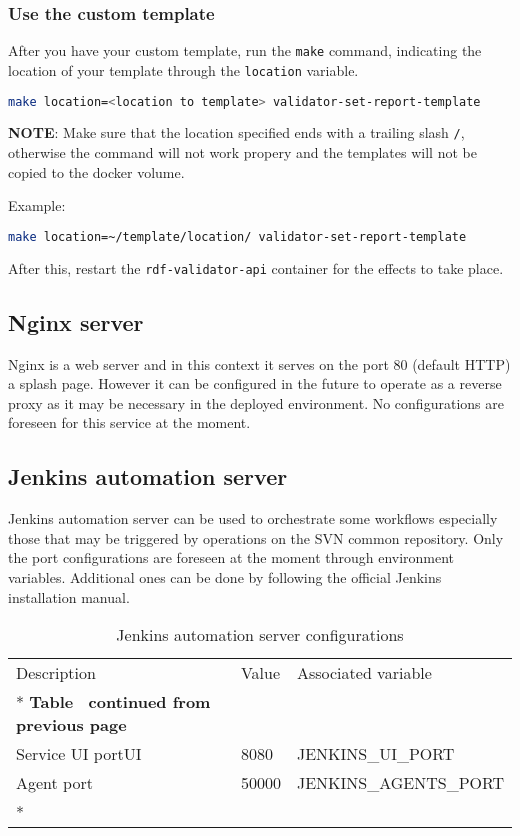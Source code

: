 	\subsubsection{Use the custom template}
	After you have your custom template, run the \texttt{make} command, indicating the location of your template through the \texttt{location} variable.
	\begin{lstlisting}[language=bash]
make location=<location to template> validator-set-report-template
	\end{lstlisting}

	\textbf{NOTE}: Make sure that the location specified ends with a trailing slash \texttt{/}, otherwise the command will not work propery and the templates will not be copied to the docker volume.

	Example:
	\begin{lstlisting}[language=bash]
make location=~/template/location/ validator-set-report-template
	\end{lstlisting}

	After this, restart the \texttt{rdf-validator-api} container for the effects to take place.


	\subsection{Nginx server}
	
	Nginx is a web server and in this context it serves on the port 80 (default HTTP) a splash page. However it can be configured in the future to operate as a reverse proxy as it may be necessary in the deployed environment. No configurations are foreseen for this service at the moment. 
	
	\subsection{Jenkins automation server}
	
	Jenkins automation server can be used to orchestrate some workflows especially those that may be triggered by operations on the SVN common repository. Only the port configurations are foreseen at the moment through environment variables. Additional ones can be done by following the official Jenkins installation manual. 
	
	\begin{longtable}[c]{@{}p{4cm}p{5cm}l@{}}
		\toprule
		Description & Value & Associated variable \\* \midrule
		\endfirsthead
		\multicolumn{3}{c}%
		{{\bfseries Table \thetable\ continued from previous page}} \\
		\endhead
		Service UI portUI & 8080 & JENKINS\_UI\_PORT \\
		Agent port & 50000 & JENKINS\_AGENTS\_PORT \\* \bottomrule
		\caption{Jenkins automation server configurations}
		\label{tab:my-table4}\\
	\end{longtable}
	
